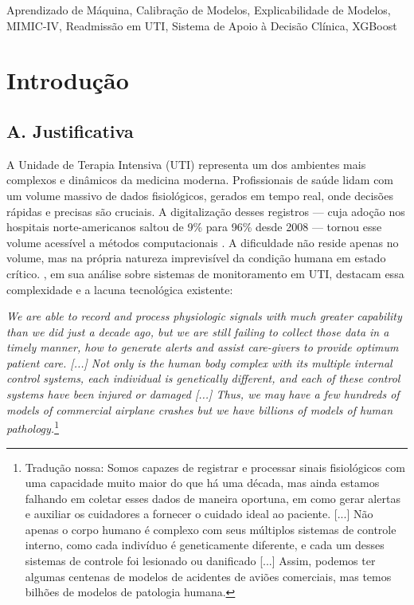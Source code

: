 \documentclass{ieeeaccess}
\begin{document}
\begin{keywords}
Aprendizado de Máquina, Calibração de Modelos, Explicabilidade de Modelos, MIMIC-IV, Readmissão em UTI, Sistema de Apoio à Decisão Clínica, XGBoost
\end{keywords}


\titlepgskip=-15pt

\maketitle

\section{Introdução}
\subsection*{A. Justificativa}
A Unidade de Terapia Intensiva (UTI) representa um dos ambientes mais complexos e dinâmicos da medicina moderna. Profissionais de saúde lidam com um volume massivo de dados fisiológicos, gerados em tempo real, onde decisões rápidas e precisas são cruciais. A digitalização desses registros --- cuja adoção nos hospitais norte-americanos saltou de 9\% para 96\% desde 2008 --- tornou esse volume acessível a métodos computacionais \cite{Patton2023}. A dificuldade não reside apenas no volume, mas na própria natureza imprevisível da condição humana em estado crítico. \cite{Gardner2014}, em sua análise sobre sistemas de monitoramento em UTI, destacam essa complexidade e a lacuna tecnológica existente:

\begin{displayquote}
\small
\textit{We are able to record and process physiologic signals with much greater capability than we did just a decade ago, but we are still failing to collect those data in a timely manner, how to generate alerts and assist care-givers to provide optimum patient care. [...] Not only is the human body complex with its multiple internal control systems, each individual is genetically different, and each of these control systems have been injured or damaged [...] Thus, we may have a few hundreds of models of commercial airplane crashes but we have billions of models of human pathology.}\footnote{Tradução nossa: Somos capazes de registrar e processar sinais fisiológicos com uma capacidade muito maior do que há uma década, mas ainda estamos falhando em coletar esses dados de maneira oportuna, em como gerar alertas e auxiliar os cuidadores a fornecer o cuidado ideal ao paciente. [...] Não apenas o corpo humano é complexo com seus múltiplos sistemas de controle interno, como cada indivíduo é geneticamente diferente, e cada um desses sistemas de controle foi lesionado ou danificado [...] Assim, podemos ter algumas centenas de modelos de acidentes de aviões comerciais, mas temos bilhões de modelos de patologia humana.}
\end{displayquote}
\end{document}
